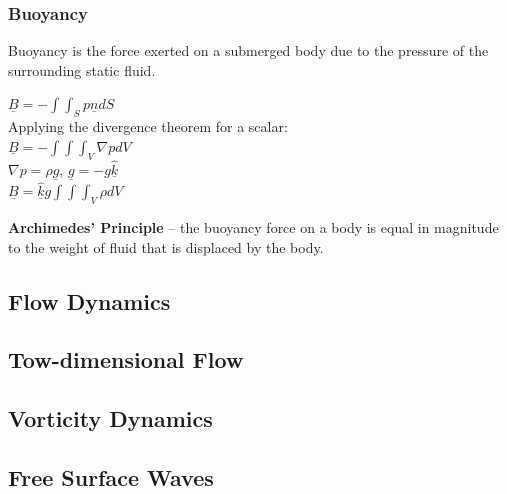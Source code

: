 \subsubsection{Buoyancy}
Buoyancy is the force exerted on a submerged body due to the pressure of the surrounding static fluid.
\begin{center}
	$\underline{B} = -\int \int_{S} p \underline{n} dS$
	\\
	Applying the divergence theorem for a scalar:
	\\
	$\underline{B} = - \int\int\int_V \nabla p dV$
	\\
	$\nabla p = \rho \underline{g}$, $\underline{g} = -g\hat{\underline{k}}$
	\\
	$\underline{B} = \hat{\underline{k}} g \int \int \int_V \rho dV$
	\\
\end{center}
\textbf{Archimedes’ Principle} – the buoyancy force on a body is equal in magnitude to the weight of fluid that is displaced by the body.
\subsection{Flow Dynamics}
\subsection{Tow-dimensional Flow}
\subsection{Vorticity Dynamics}
\subsection{Free Surface Waves}